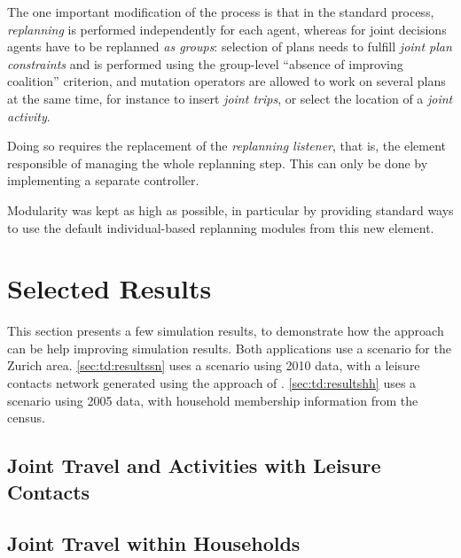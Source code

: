 {The one important modification of the process is that in the standard \matsim process,
\emph{replanning} is performed independently for each agent,
whereas for joint decisions agents have to be replanned \emph{as groups}:
selection of plans needs to fulfill \emph{joint plan constraints}
and is performed using the group-level ``absence of improving coalition''
criterion, and mutation operators are allowed to work on several plans at the same time,
for instance to insert \emph{joint trips}, or select the location of a
\emph{joint activity}.

Doing so requires the replacement of the \emph{replanning listener},
that is, the element responsible of managing the whole replanning step.
This can only be done by implementing a separate controller.

Modularity was kept as high as possible, in particular by providing standard ways
to use the default individual-based replanning modules from this new element.

\section{Selected Results\label{sec:td:results}}
This section presents a few simulation results,
to demonstrate how the approach can be help improving simulation results.
Both applications use a scenario for the Zurich area.
\cref{sec:td:resultssn} uses a scenario using 2010 data,
with a leisure contacts network generated using the approach of .
\cref{sec:td:resultshh} uses a scenario using 2005 data,
with household membership information from the census.


\subsection{Joint Travel and Activities with Leisure Contacts\label{sec:td:resultssn}}


\subsection{Joint Travel within Households\label{sec:td:resultshh}}

}
